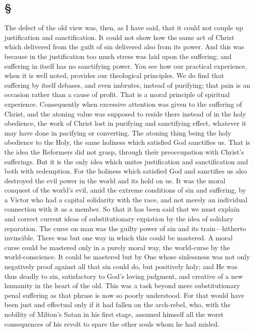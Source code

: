 \documentclass[draft]{ptfdoc}
\begin{document}
\subsection*{
\S
}

The defect of the old view was, then, as I have 
said, that it could not couple up justification 
and sanctification. It could not show how the 
same act of Christ which delivered from the 
guilt of sin delivered also from its power. And 
this was because in the justification too much 
stress was laid upon the suffering; and suffering 
in itself has no sanctifying power. You see how 
our practical experience, when it is well noted, 
provides our theological principles. We do 
find that suffering by itself debases, and even 
imbrutes, instead of purifying; that pain is an 
occasion rather than a cause of profit. That is 
a moral principle of spiritual experience. Consequently 
when excessive attention was given to 
the suffering of Christ, and the atoning value 
was supposed to reside there instead of in the 
holy obedience, the work of Christ lost in purifying 
and sanctifying effect, whatever it may 
have done in pacifying or converting. The 
atoning thing being the holy obedience to the 
Holy, the same holiness which satisfied God 
sanctifies us. That is the idea the Reformers 
did not grasp, through their preoccupation 
with Christ's sufferings. But it is the only 
idea which unites justification and sanctification 
and both with redemption. For the holiness 
which satisfied God and sanctifies us also 
destroyed the evil power in the world and 
its hold on us. It was the moral conquest 
of the world's evil, amid the extreme conditions 
of sin and suffering, by a Victor who 
had a capital solidarity with the race, and not 
merely an individual connection with it as a 
member. So that it has been said that we 
must explain and correct current ideas of substitutionary 
expiation by the idea of solidary 
reparation. The curse on man was the guilty 
power of sin and its train---hitherto invincible. 
There was but one way in which this could be 
mastered. A moral curse could be mastered 
only in a purely moral way, the world-curse 
by the world-conscience. It could be mastered 
but by One whose sinlessness was not only 
negatively proof against all that sin could do, 
but positively holy; and He was thus deadly to 
sin, satisfactory to God's loving judgment, and 
creative of a new humanity in the heart of the 
old. This was a task beyond mere substitutionary 
penal suffering as that phrase is now so 
poorly understood. For that would have been 
just and effectual only if it had fallen on the 
arch-rebel, who, with the nobility of Milton's 
Satan in his first stage, assumed himself all the 
worst consequences of his revolt to spare the 
other souls whom he had misled. 
\end{document}

